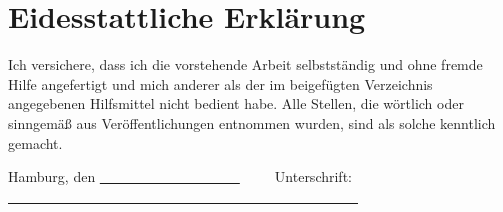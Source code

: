 \documentclass[]{article}
\begin{document}
\newpage
\thispagestyle{empty}
\section*{Eidesstattliche Erklärung} 

Ich versichere, dass ich die vorstehende Arbeit selbstständig und ohne fremde Hilfe angefertigt und mich anderer als der im beigefügten Verzeichnis angegebenen Hilfsmittel nicht bedient habe. Alle Stellen, die wörtlich oder sinngemäß aus Veröffentlichungen entnommen wurden, sind als solche kenntlich gemacht. \\


\vspace{2cm}

\noindent Hamburg, den \uline{~~~~~~~~~~~~~~~~~~~~}~~~~~Unterschrift: \uline{~~~~~~~~~~~~~~~~~~~~~~~~~~~~~~~~~~~~~~~~~~~~~~~~~~}
\end{document}
